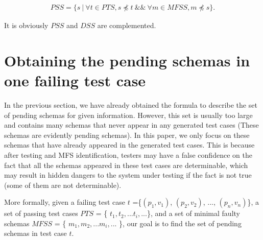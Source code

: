\begin{equation}
\begin{aligned}\label{eq:pss}
PSS=\{ s\ |\ \forall t \in PTS,  s \npreceq t  \ \&\& \  \forall m \in MFSS, m \npreceq s \}.
\end{aligned}
\end{equation}

It is obviously $PSS$ and $DSS$ are complemented.

%
%

%

\section{Obtaining the pending schemas in one failing test case}\label{sec:pending:obtaining}

In the previous section, we have already obtained the formula to describe the set of pending schemas for given information. However, this set is usually too large and contains many schemas that never appear in any generated test cases (These schemas are evidently pending schemas). In this paper, we only focus on these schemas that have already appeared in the generated test cases. This is because after testing and MFS identification, testers may have a false confidence on the fact that all the schemas appeared in these test cases are determinable, which may result in hidden dangers to the system under testing if the fact is not true (some of them are not determinable).


More formally,  given a failing test case $t$ =\{$(p_{1}, v_{1})$, $(p_{2}, v_{2})$, ..., $(p_{n}, v_{n})$\},  a set of passing test cases $PTS$ = \{ $t_{1}, t_{2}, ... t_{i}, ...$\}, and a set of minimal faulty schemas $MFSS$ = \{ $m_{1}, m_{2}, ... m_{i}, ...$ \}, our goal is to find the set of pending schemas in test case $t$.


